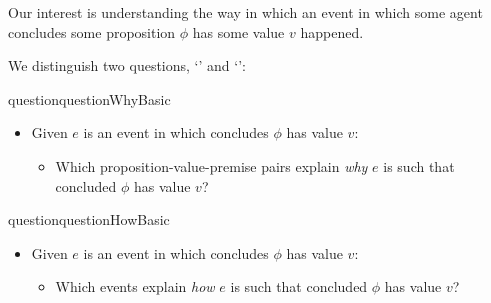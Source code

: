 \begin{note}
  Our interest is understanding the way in which an event in which some agent \vAgent{} concludes some proposition \(\phi\) has some value \(v\) happened.

  We distinguish two questions, `\qWhy{}' and `\qHow{}':

  \begin{restatable}[\qWhy{}]{question}{questionWhyBasic}
    \label{q:why}
    \begin{itemize}
    \item
      Given \(e\) is an event in which \vAgent{} concludes \(\phi\) has value \(v\):
      \begin{itemize}
      \item
        Which proposition-value-premise pairs explain \emph{why} \(e\) is such that \vAgent{} concluded \(\phi\) has value \(v\)?
      \end{itemize}
    \end{itemize}
    \vspace{-\baselineskip}
  \end{restatable}

  \begin{restatable}[\qHow{}]{question}{questionHowBasic}
    \label{q:how}
    \begin{itemize}
    \item
      Given \(e\) is an event in which \vAgent{} concludes \(\phi\) has value \(v\):
      \begin{itemize}
      \item
        Which events explain \emph{how} \(e\) is such that \vAgent{} concluded \(\phi\) has value \(v\)?
      \end{itemize}
    \end{itemize}
    \vspace{-\baselineskip}
  \end{restatable}
\end{note}


